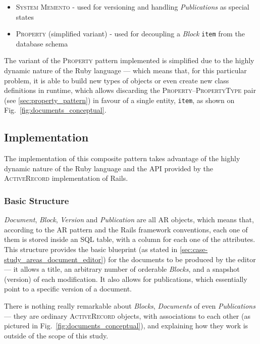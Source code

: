 \begin{itemize}
  \item \textsc{System Memento} - used for versioning and handling \emph{Publications} as special states
  \item \textsc{Property} (simplified variant) - used for decoupling a \emph{Block} \texttt{item} from the database schema
\end{itemize}

The variant of the \textsc{Property} pattern implemented is simplified due to the highly dynamic nature of the Ruby language --- which means that, for this particular problem, it is able to build new types of objects or even create new class definitions in runtime, which allows discarding the \textsc{Property}--\textsc{PropertyType} pair (see \ref{sec:property_pattern}) in favour of a single entity, \texttt{item}, as shown on Fig.~\ref{fig:documents_conceptual}.

\subsection{Implementation}\label{sec:fa_documents_implementation}

The implementation of this composite pattern takes advantage of the highly dynamic nature of the Ruby language and the API provided by the \textsc{ActiveRecord} implementation of Rails.

\subsubsection{Basic Structure}\label{sec:fa_documents_implementation_basic_structure}

\emph{Document}, \emph{Block}, \emph{Version} and \emph{Publication} are all AR objects, which means that, according to the AR pattern and the Rails framework conventions, each one of them is stored inside an SQL table, with a column for each one of the attributes. This structure provides the basic blueprint (as stated in \ref{sec:case-study_areas_document_editor}) for the documents to be produced by the editor --- it allows a title, an arbitrary number of orderable \emph{Blocks}, and a snapshot (version) of each modification. It also allows for publications, which essentially point to a specific version of a document.

There is nothing really remarkable about \emph{Blocks}, \emph{Documents} of even \emph{Publications} --- they are ordinary \textsc{ActiveRecord} objects, with associations to each other (as pictured in Fig.~\ref{fig:documents_conceptual}), and explaining how they work is outside of the scope of this study.

